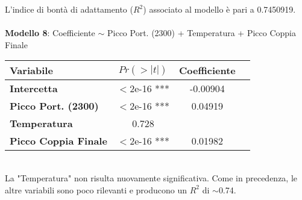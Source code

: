 \documentclass[fleqn,10pt]{SelfArx} %
\begin{document}
L'indice di bontà di adattamento ($R^2$) associato al modello è pari a 0.7450919.\\
\\
\textbf{Modello 8}: Coefficiente $\sim$ Picco Port. (2300) + Temperatura + Picco Coppia Finale
{\begin{table}[H] 
\centering
\begin{tabular}[t]{lccc}
\toprule 
Variabile&$Pr(> |t|)$&Coefficiente\\
\midrule 
\textbf{Intercetta}&$<$2e-16 ***&-0.00904\\ 
\textbf{Picco Port. (2300)}&$<$2e-16 ***&0.04919\\
\textbf{Temperatura}&0.728\\
\textbf{Picco Coppia Finale}&$<$2e-16 ***&0.01982\\
\bottomrule 
\end{tabular}
\end{table}}\\
La "Temperatura" non risulta nuovamente significativa. Come in precedenza, le altre variabili sono poco rilevanti e producono un $R^2$ di $\sim$0.74.
\end{document}
